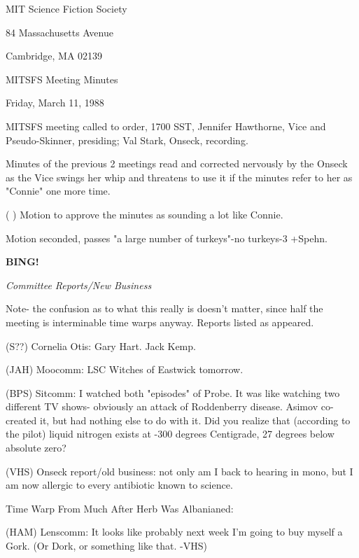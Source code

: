 \documentclass[12pt]{article}
\newcommand{\bing}{{\bf BING!} }
\newcommand{\goto}[1]{\bing \vskip 12pt \centerline{{\em{#1}}}}
\begin{document}
\begin{center}

MIT Science Fiction Society 

84 Massachusetts Avenue

Cambridge, MA 02139

\vspace{12pt}

MITSFS Meeting Minutes 

Friday, March 11, 1988

\end{center}
 
\vspace{18pt}

\setlength{\parskip}{6pt}

\noindent
MITSFS meeting called to order, 1700 SST,
Jennifer Hawthorne, Vice and Pseudo-Skinner, presiding; Val Stark, Onseck, recording.

Minutes of the previous 2 meetings read and corrected nervously by the Onseck as the Vice swings her whip and threatens to use it if the minutes refer to her as "Connie" one more time.

( ) Motion to approve the minutes as sounding a lot like Connie.

Motion seconded, passes "a large number of turkeys"-no turkeys-3 +Spehn.

\goto{Committee Reports/New Business}

Note- the confusion as to what this really is doesn't matter, since half the meeting is interminable time warps anyway. Reports listed as appeared.

(S??) Cornelia Otis: Gary Hart. Jack Kemp.

(JAH) Moocomm: LSC Witches of Eastwick tomorrow.

(BPS) Sitcomm: I watched both "episodes" of Probe. It was like watching two different TV shows- obviously an attack of Roddenberry disease. Asimov co-created it, but had nothing else to do with it. Did you realize that (according to the pilot) liquid nitrogen exists at -300 degrees Centigrade, 27 degrees below absolute zero?

(VHS) Onseck report/old business: not only am I back to hearing in mono, but I am now allergic to every antibiotic known to science.

Time Warp From Much After Herb Was Albanianed:

(HAM) Lenscomm: It looks like probably next week I'm going to buy myself a Gork. (Or Dork, or something like that. -VHS)
\end{document}
